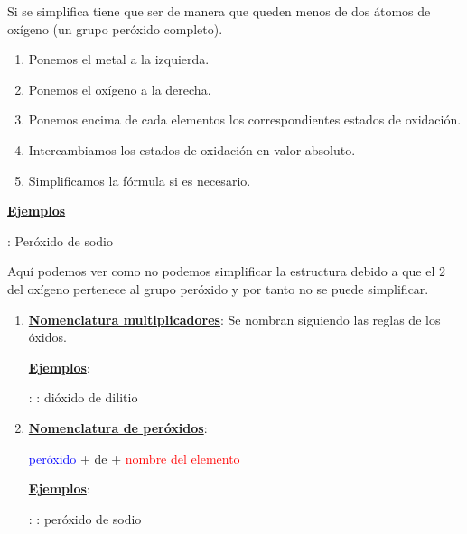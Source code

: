 \documentclass[12pt]{article}
\begin{document}
Si se simplifica tiene que ser de manera que  queden menos de dos átomos de oxígeno (un grupo peróxido completo).

\vspace*{2mm}

\begin{enumerate}[label=\itembolascolor{\arabic*}{green!40!black}]
    \item Ponemos el metal a la izquierda.
    \item Ponemos el oxígeno a la derecha.
    \item Ponemos encima de cada elementos los correspondientes estados de oxidación.
    \item Intercambiamos los estados de oxidación en valor absoluto.
    \item Simplificamos la fórmula si es necesario.
\end{enumerate}

\textbf{\uline{Ejemplos}}

 : Peróxido de sodio \ch{->}   \ch{->} 

Aquí podemos ver como no podemos simplificar la estructura debido a que el $2$ del oxígeno pertenece al grupo peróxido y por tanto no se puede simplificar.


\vspace*{2mm}

\begin{enumerate}[label=\itembolascolor{\arabic*}{blue}]
    \item \textbf{\uline{Nomenclatura multiplicadores}}: Se nombran siguiendo las reglas de los óxidos.

          \textbf{\uline{Ejemplos}}:

           : : dióxido de dilitio

    \item \textbf{\uline{Nomenclatura de peróxidos}}:
          \begin{center}
              \textcolor{blue}{peróxido} + de + \textcolor{red}{nombre del elemento}
          \end{center}

          \textbf{\uline{Ejemplos}}:

           : : peróxido de sodio

\end{enumerate}
\end{document}
